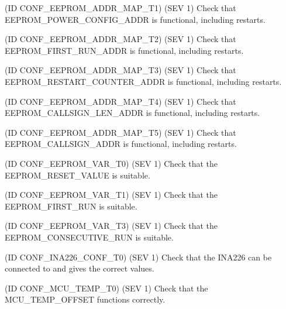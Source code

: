 \begin{DoxyRefList}
(ID C\+O\+N\+F\+\_\+\+E\+E\+P\+R\+O\+M\+\_\+\+A\+D\+D\+R\+\_\+\+M\+A\+P\+\_\+\+T1) (S\+EV 1) Check that E\+E\+P\+R\+O\+M\+\_\+\+P\+O\+W\+E\+R\+\_\+\+C\+O\+N\+F\+I\+G\+\_\+\+A\+D\+DR is functional, including restarts. 

(ID C\+O\+N\+F\+\_\+\+E\+E\+P\+R\+O\+M\+\_\+\+A\+D\+D\+R\+\_\+\+M\+A\+P\+\_\+\+T2) (S\+EV 1) Check that E\+E\+P\+R\+O\+M\+\_\+\+F\+I\+R\+S\+T\+\_\+\+R\+U\+N\+\_\+\+A\+D\+DR is functional, including restarts. 

(ID C\+O\+N\+F\+\_\+\+E\+E\+P\+R\+O\+M\+\_\+\+A\+D\+D\+R\+\_\+\+M\+A\+P\+\_\+\+T3) (S\+EV 1) Check that E\+E\+P\+R\+O\+M\+\_\+\+R\+E\+S\+T\+A\+R\+T\+\_\+\+C\+O\+U\+N\+T\+E\+R\+\_\+\+A\+D\+DR is functional, including restarts. 

(ID C\+O\+N\+F\+\_\+\+E\+E\+P\+R\+O\+M\+\_\+\+A\+D\+D\+R\+\_\+\+M\+A\+P\+\_\+\+T4) (S\+EV 1) Check that E\+E\+P\+R\+O\+M\+\_\+\+C\+A\+L\+L\+S\+I\+G\+N\+\_\+\+L\+E\+N\+\_\+\+A\+D\+DR is functional, including restarts. 

(ID C\+O\+N\+F\+\_\+\+E\+E\+P\+R\+O\+M\+\_\+\+A\+D\+D\+R\+\_\+\+M\+A\+P\+\_\+\+T5) (S\+EV 1) Check that E\+E\+P\+R\+O\+M\+\_\+\+C\+A\+L\+L\+S\+I\+G\+N\+\_\+\+A\+D\+DR is functional, including restarts. 
\item[\label{test__test000021}%
\Hypertarget{test__test000021}%
Module \hyperlink{group__defines__eeprom__variables}{defines\+\_\+eeprom\+\_\+variables} ](ID C\+O\+N\+F\+\_\+\+E\+E\+P\+R\+O\+M\+\_\+\+V\+A\+R\+\_\+\+T0) (S\+EV 1) Check that the E\+E\+P\+R\+O\+M\+\_\+\+R\+E\+S\+E\+T\+\_\+\+V\+A\+L\+UE is suitable. 

(ID C\+O\+N\+F\+\_\+\+E\+E\+P\+R\+O\+M\+\_\+\+V\+A\+R\+\_\+\+T1) (S\+EV 1) Check that the E\+E\+P\+R\+O\+M\+\_\+\+F\+I\+R\+S\+T\+\_\+\+R\+UN is suitable. 

(ID C\+O\+N\+F\+\_\+\+E\+E\+P\+R\+O\+M\+\_\+\+V\+A\+R\+\_\+\+T3) (S\+EV 1) Check that the E\+E\+P\+R\+O\+M\+\_\+\+C\+O\+N\+S\+E\+C\+U\+T\+I\+V\+E\+\_\+\+R\+UN is suitable. 
\item[\label{test__test000019}%
\Hypertarget{test__test000019}%
Module \hyperlink{group__defines__ina226__configuration}{defines\+\_\+ina226\+\_\+configuration} ](ID C\+O\+N\+F\+\_\+\+I\+N\+A226\+\_\+\+C\+O\+N\+F\+\_\+\+T0) (S\+EV 1) Check that the I\+N\+A226 can be connected to and gives the correct values. 
\item[\label{test__test000024}%
\Hypertarget{test__test000024}%
Module \hyperlink{group__defines__mcu__temperature__configuration}{defines\+\_\+mcu\+\_\+temperature\+\_\+configuration} ](ID C\+O\+N\+F\+\_\+\+M\+C\+U\+\_\+\+T\+E\+M\+P\+\_\+\+T0) (S\+EV 1) Check that the M\+C\+U\+\_\+\+T\+E\+M\+P\+\_\+\+O\+F\+F\+S\+ET functions correctly. 


\end{DoxyRefList}
